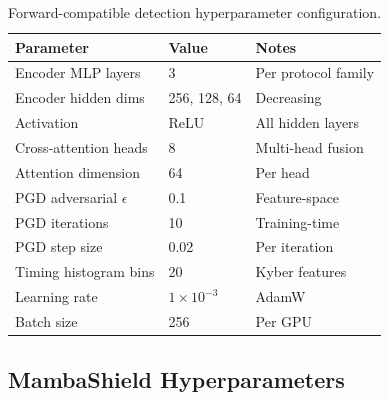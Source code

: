\begin{table}[htbp]
\centering
\caption{Forward-compatible detection hyperparameter configuration.}
\label{tab:hp_pqidps}
\begin{tabular}{lll}
\toprule
Parameter & Value & Notes \\
\midrule
Encoder MLP layers         & 3     & Per protocol family \\
Encoder hidden dims        & 256, 128, 64 & Decreasing \\
Activation                 & ReLU  & All hidden layers \\
Cross-attention heads      & 8     & Multi-head fusion \\
Attention dimension        & 64    & Per head \\
PGD adversarial $\epsilon$ & 0.1   & Feature-space \\
PGD iterations             & 10    & Training-time \\
PGD step size              & 0.02  & Per iteration \\
Timing histogram bins      & 20    & Kyber features \\
Learning rate              & $1\times10^{-3}$ & AdamW \\
Batch size                 & 256   & Per GPU \\
\bottomrule
\end{tabular}
\end{table}


\subsection{MambaShield Hyperparameters}
\label{app:hp_mamba}

